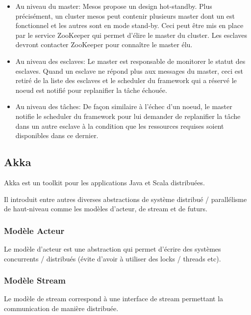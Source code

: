 \documentclass[a4paper, 11pt, titlepage]{article}
\begin{document}
\begin{itemize}

\item
Au niveau du master: Mesos propose un design hot-standby. Plus précisément, un cluster mesos peut contenir plusieurs master dont un est fonctionnel et les autres sont en mode stand-by. Ceci peut être mis en place par le service ZooKeeper qui permet d'élire le master du cluster. Les esclaves devront contacter ZooKeeper pour connaître le master élu.


\item
Au niveau des esclaves: Le master est responsable de monitorer le statut des esclaves. Quand un esclave ne répond plus aux messages du master, ceci est retiré de la liste des esclaves et le scheduler du framework qui a réservé le noeud est notifié pour replanifier la tâche échouée.

\item
Au niveau des tâches: De façon similaire à l'échec d'un noeud, le master notifie le scheduler du framework pour lui demander de replanifier la tâche dans un autre esclave à la condition que les ressources requises soient disponibles dans ce dernier.

\end{itemize}


\newpage
\subsection {Akka}

Akka est un toolkit pour les applications Java et Scala distribuées.

\noindent Il introduit entre autres diverses abstractions de système distribué / parallélisme de haut-niveau comme les modèles d'acteur, de stream et de futurs.


\subsubsection {Modèle Acteur}

Le modèle d'acteur est une abstraction qui permet d'écrire des systèmes concurrents / distribués (évite d'avoir à utiliser des locks / threads etc).


\subsubsection {Modèle Stream}

Le modèle de stream correspond à une interface de stream permettant la communication de manière distribuée.
\end{document}
